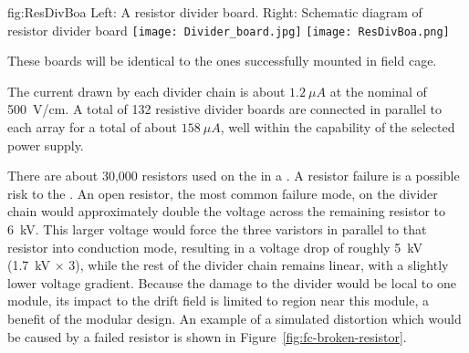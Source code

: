 \begin{dunefigure}{fig:ResDivBoa}
  {Left: A  resistor divider board. Right: Schematic diagram of resistor divider board}
  \texttt{[image: Divider\_board.jpg]}
  \texttt{[image: ResDivBoa.png]}
\end{dunefigure}

These boards will be identical to the ones successfully mounted in  field cage. 

The current drawn by each divider chain is about $1.2~\mu A$ at the nominal \efield{} of \SI{500}{V/cm}. A total of 132 resistive divider %
boards  are connected in parallel to each  array for a total of about $158~\mu A$, well within the capability of the selected  power supply.

There are about 30,000 resistors used on the  in a . A resistor failure is a possible risk to the .  
An open resistor, the most common failure mode, on the divider chain would approximately double the voltage across the remaining resistor to \SI{6}{kV}.  This larger voltage would force the three varistors in parallel to that resistor into conduction mode, resulting in a voltage drop of roughly \SI{5}{kV} (\SI{1.7}{kV} $\times$ \num{3}), while the rest of the divider chain remains linear, with a slightly lower voltage gradient. 
Because the damage to the divider would be local to one module, its impact to the  drift field is limited to region near this module, a benefit of the modular  design.
An example of a simulated \efield{} distortion which would be caused by a failed resistor is shown in Figure~\ref{fig:fc-broken-resistor}. 


